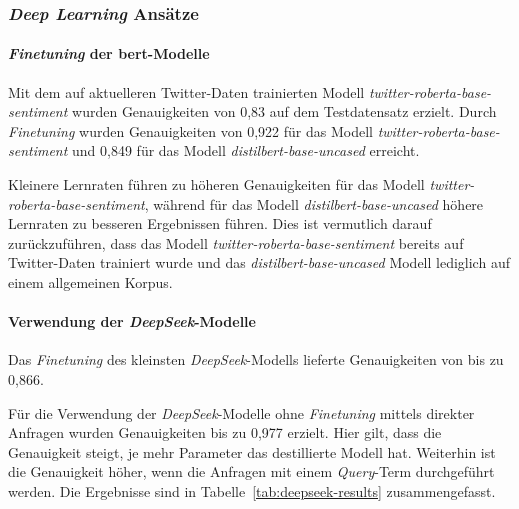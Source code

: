 \subsubsection{\textit{Deep Learning} Ansätze}\label{subsubsec:ergebnisse-deep-learning-ansaetze}

\paragraph{\textit{Finetuning} der \gls{bert}-Modelle}
Mit dem auf aktuelleren Twitter-Daten trainierten Modell \textit{twitter-roberta-base-sentiment} wurden Genauigkeiten von 0,83 auf dem Testdatensatz erzielt.
Durch \textit{Finetuning} wurden Genauigkeiten von 0,922 für das Modell \textit{twitter-roberta-base-sentiment} und 0,849 für das Modell \textit{distilbert-base-uncased} erreicht.

Kleinere Lernraten führen zu höheren Genauigkeiten für das Modell \textit{twitter-roberta-base-sentiment}, während für das Modell \textit{distilbert-base-uncased} höhere Lernraten zu bes\-se\-ren Ergebnissen führen.
Dies ist vermutlich darauf zurückzuführen, dass das Modell \textit{twitter-roberta-base-sentiment} bereits auf Twitter-Daten trainiert wurde und das \textit{distilbert-base-uncased} Modell lediglich auf einem allgemeinen Korpus.

\paragraph{Verwendung der \textit{DeepSeek}-Modelle}
Das \textit{Finetuning} des kleinsten \textit{DeepSeek}-Modells lieferte Genauigkeiten von bis zu 0,866.

Für die Verwendung der \textit{DeepSeek}-Modelle ohne \textit{Finetuning} mittels direkter Anfragen wurden Genauigkeiten bis zu 0,977 erzielt.
Hier gilt, dass die Genauigkeit steigt, je mehr Parameter das destillierte Modell hat.
Weiterhin ist die Genauigkeit höher, wenn die Anfragen mit einem \textit{Query}-Term durchgeführt werden.
Die Ergebnisse sind in Tabelle~\ref{tab:deepseek-results} zusammengefasst.

